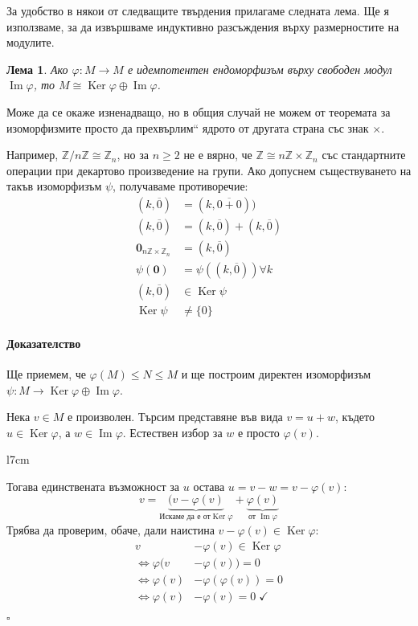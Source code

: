 \documentclass{article}
\newif\ifusemulticols
\newif\ifmobileview
\theoremstyle{definition}
\theoremstyle{remark}
\theoremstyle{plain}
\theoremstyle{plain}
\newtheorem{lemma}[theorem]{Лема}
\newenvironment{mymulticols}
    { \ifusemulticols \begin{multicols}{2} \fi }
    { \ifusemulticols \end{multicols} \fi }
\newcommand\mywrapbegin[3]{\ifmobileview\else\begin{wrapfigure}[#1]{#2}{#3}\fi}
\newcommand\mywrapend{\ifmobileview\else\end{wrapfigure}\fi}
\newenvironment{myproof}{\paragraph{Доказателство}}{\hfill$\square$}
\DeclareMathOperator{\Ker}{Ker}
\DeclareMathOperator{\image}{Im}
\newcommand{\Z}{\mathbb{Z}}
\begin{document}
\begin{mymulticols}
За удобство в някои от следващите твърдения прилагаме следната лема. Ще я използваме, за да извършваме
индуктивно разсъждения върху размерностите на модулите.
\begin{lemma}
    \label{prop:idemp_endo_iso}
    Ако $\varphi : M \to M$ е идемпотентен ендоморфизъм върху свободен модул $\image \varphi$,
    то $M \cong \Ker \varphi \oplus \image \varphi$.
\end{lemma}
Може да се окаже изненадващо, но в общия случай не можем от теоремата за изоморфизмите просто да
\quotedblbase прехвърлим`` ядрото от другата страна със знак $\times$.

Например, $\Z / n \Z \cong \Z_n$, но за $n \ge 2$ не е вярно, че $\Z \cong n \Z\times \Z_n$ със
стандартните операции при декартово произведение на групи.
Ако допуснем съществуването на такъв изоморфизъм $\psi$, получаваме противоречие:
\begin{align*}
    (k,\overline 0) &= (k, \overline{0+0}))\\
    (k, \overline 0) &= (k, \overline 0) + (k, \overline 0)\\
    \boldsymbol{0}_{n\Z \times \Z_n} &= (k, \overline 0)\\
    \psi(\boldsymbol 0)&= \psi((k, \overline 0))\forall k\\
    (k, \overline 0) &\in \Ker \psi\\
    \Ker \psi &\not= \{0\}
\end{align*}

\begin{myproof}
    Ще приемем, че $\varphi(M) \le N \le M$ и ще построим директен изоморфизъм $\psi: M \to {\Ker \varphi \oplus \image \varphi}$.

    Нека $v \in M$ е произволен.
    Търсим представяне във вида $v = u + w$, където $u \in \Ker \varphi$, а $w \in \image\varphi$.
    Естествен избор за $w$ е просто $\varphi(v)$.

    \mywrapbegin{10}{l}{7cm}
    \mywrapend

    Тогава единствената възможност за $u$ остава $u = {v - w} = v - \varphi(v)$:
    $$v =
        \underbrace{(v-\varphi(v)}_{\text{Искаме да е от}\Ker\varphi}
        + \underbrace{\varphi(v)}_{\text{от }\image\varphi}
    $$
    Трябва да проверим, обаче, дали наистина ${v - \varphi(v)} \in \Ker\varphi$:
    \vspace{-10pt}
    \begin{align*}
        v &- \varphi(v) \in \Ker\varphi\\
        \Leftrightarrow \varphi(v&-\varphi(v)) = 0\\
        \Leftrightarrow \varphi(v)&-\varphi(\varphi(v))=0\\
        \Leftrightarrow \varphi(v)&-\varphi(v)=0\;\checkmark
    \end{align*}


\end{myproof}
\end{mymulticols}
\end{document}
